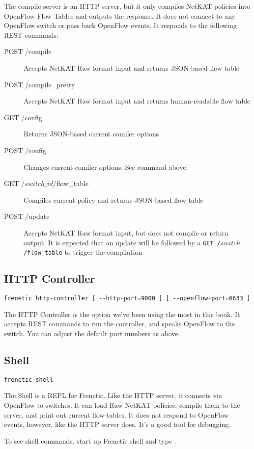 The compile server is an HTTP server, but it only compiles NetKAT policies into OpenFlow Flow Tables 
and outputs the response.  It does not connect to any OpenFlow switch or pass back OpenFlow events.  
It responds to the following REST commands:

\begin{description}
\item[POST /compile] Accepts NetKAT Raw format input and returns JSON-based flow table   
\item[POST /compile\_pretty] Accepts NetKAT Raw format input and returns human-readable flow table   
\item[GET /config] Returns JSON-based current comiler options   
\item[POST /config] Changes current comiler options.  See command  above.
\item[GET /$switch\_id$/flow\_table] Compiles current policy and returns JSON-based flow table   
\item[POST /update] Accepts NetKAT Raw format input, but does not compile or return output.  It is expected
that an update will be followed by a \texttt{GET /$switch$/flow\_table} to trigger the compilation   
\end{description}

\subsection{HTTP Controller}

\begin{verbatim}
frenetic http-controller [ --http-port=9000 ] [ --openflow-port=6633 ]
\end{verbatim}

The HTTP Controller is the option we've been using the most in this book.  It accepts REST commands
to run the controller, and speaks OpenFlow to the switch.  You can adjust the default port numbers as
above.  

\subsection{Shell}

\begin{verbatim}
frenetic shell 
\end{verbatim}

The Shell is a REPL for Frenetic.  Like the HTTP server, it connects via OpenFlow to switches.  
It can load Raw NetKAT policies, compile them to the server, and print out current flow-tables.  
It does not respond to OpenFlow events, however, like the HTTP server does.  It's a good tool for debugging.

To see shell commands, start up Frenetic shell and type .